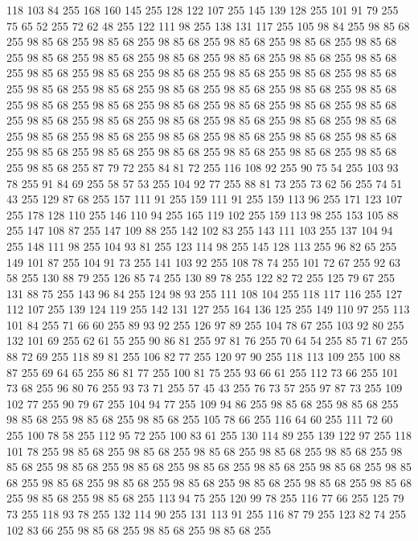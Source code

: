 118 103 84 255 168 160 145 255 128 122 107 255 145 139 128 255 101 91 79 255 75 65 52 255 72 62 48 255 122 111 98 255 138 131 117 255 105 98 84 255 98 85 68 255 98 85 68 255 98 85 68 255 98 85 68 255 98 85 68 255 98 85 68 255 98 85 68 255 98 85 68 255 98 85 68 255 98 85 68 255 98 85 68 255 98 85 68 255 98 85 68 255 98 85 68 255 98 85 68 255 98 85 68 255 98 85 68 255 98 85 68 255 98 85 68 255 98 85 68 255 98 85 68 255 98 85 68 255 98 85 68 255 98 85 68 255 98 85 68 255 98 85 68 255 98 85 68 255 98 85 68 255 98 85 68 255 98 85 68 255 98 85 68 255 98 85 68 255 98 85 68 255 98 85 68 255 98 85 68 255 98 85 68 255 98 85 68 255 98 85 68 255 98 85 68 255 98 85 68 255 98 85 68 255 98 85 68 255 98 85 68 255 98 85 68 255 98 85 68 255 98 85 68 255 98 85 68 255 98 85 68 255 98 85 68 255 98 85 68 255 87 79 72 255 84 81 72 255 116 108 92 255 90 75 54 255
103 93 78 255 91 84 69 255 58 57 53 255 104 92 77 255 88 81 73 255 73 62 56 255 74 51 43 255 129 87 68 255 157 111 91 255 159 111 91 255 159 113 96 255 171 123 107 255 178 128 110 255 146 110 94 255 165 119 102 255 159 113 98 255 153 105 88 255 147 108 87 255 147 109 88 255 142 102 83 255 143 111 103 255 137 104 94 255 148 111 98 255 104 93 81 255 123 114 98 255 145 128 113 255 96 82 65 255 149 101 87 255 104 91 73 255 141 103 92 255 108 78 74 255 101 72 67 255 92 63 58 255 130 88 79 255 126 85 74 255 130 89 78 255 122 82 72 255 125 79 67 255 131 88 75 255 143 96 84 255 124 98 93 255 111 108 104 255 118 117 116 255 127 112 107 255 139 124 119 255 142 131 127 255 164 136 125 255 149 110 97 255 113 101 84 255 71 66 60 255 89 93 92 255 126 97 89 255 104 78 67 255 103 92 80 255 132 101 69 255 62 61 55 255 90 86 81 255 97 81 76 255 70 64 54 255 85 71 67 255 88 72 69 255 118 89 81 255 106 82 77 255 120 97 90 255
118 113 109 255 100 88 87 255 69 64 65 255 86 81 77 255 100 81 75 255 93 66 61 255 112 73 66 255 101 73 68 255 96 80 76 255 93 73 71 255 57 45 43 255 76 73 57 255 97 87 73 255 109 102 77 255 90 79 67 255 104 94 77 255 109 94 86 255 98 85 68 255 98 85 68 255 98 85 68 255 98 85 68 255 98 85 68 255 105 78 66 255 116 64 60 255 111 72 60 255 100 78 58 255 112 95 72 255 100 83 61 255 130 114 89 255 139 122 97 255 118 101 78 255 98 85 68 255 98 85 68 255 98 85 68 255 98 85 68 255 98 85 68 255 98 85 68 255 98 85 68 255 98 85 68 255 98 85 68 255 98 85 68 255 98 85 68 255 98 85 68 255 98 85 68 255 98 85 68 255 98 85 68 255 98 85 68 255 98 85 68 255 98 85 68 255 98 85 68 255 98 85 68 255 113 94 75 255 120 99 78 255 116 77 66 255 125 79 73 255 118 93 78 255 132 114 90 255 131 113 91 255 116 87 79 255 123 82 74 255 102 83 66 255 98 85 68 255 98 85 68 255 98 85 68 255
